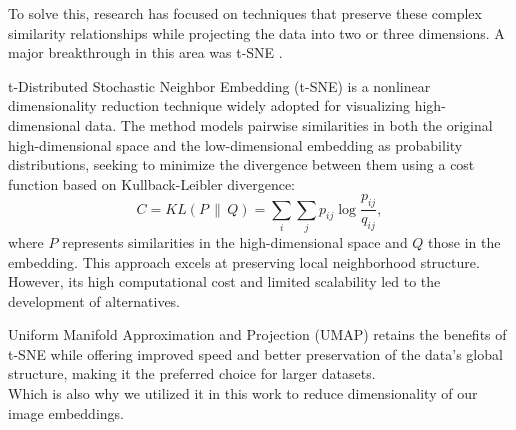 \documentclass[
  a4paper,  %
  twoside,  %
  bibliography=totoc,
  headsepline,
  cleardoublepage=empty,
  parskip=half,
  draft=false
]{scrbook}
\begin{document}
To solve this, research has focused on techniques that preserve these complex similarity relationships while projecting the data into two or three dimensions. A major breakthrough in this area was t-SNE \cite{van2008visualizing}.

t-Distributed Stochastic Neighbor Embedding (t-SNE) \cite{van2008visualizing} is a nonlinear dimensionality reduction technique widely adopted for visualizing high-dimensional data. The method models pairwise similarities in both the original high-dimensional space and the low-dimensional embedding as probability distributions, seeking to minimize the divergence between them using a cost function based on Kullback-Leibler divergence:
\begin{equation}
	C = KL(P \,\|\, Q) = \sum_i \sum_j p_{ij} \log \frac{p_{ij}}{q_{ij}},
\end{equation}
where $P$ represents similarities in the high-dimensional space and $Q$ those in the embedding. This approach excels at preserving local neighborhood structure. However, its high computational cost and limited scalability led to the development of alternatives.

Uniform Manifold Approximation and Projection (UMAP) retains the benefits of t-SNE while offering improved speed and better preservation of the data's global structure, making it the preferred choice for larger datasets.\\
Which is also why we utilized it in this work to reduce dimensionality of our image embeddings.
\end{document}
